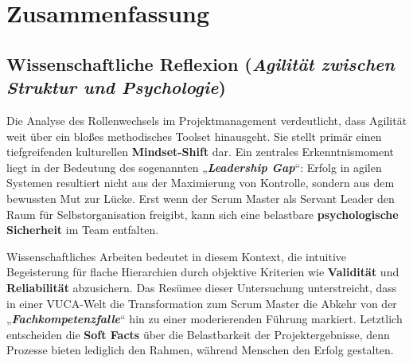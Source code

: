 
\chapter*{Zusammenfassung}
\label{chap:Zusammenfassung}
\thispagestyle{fancy}
\section*{Wissenschaftliche Reflexion (\textit{Agilität zwischen Struktur und Psychologie})} \par Die Analyse des Rollenwechsels im Projektmanagement verdeutlicht, dass Agilität weit über ein bloßes methodisches Toolset hinausgeht. Sie stellt primär einen tiefgreifenden kulturellen \textbf{Mindset-Shift} dar. Ein zentrales Erkenntnismoment liegt in der Bedeutung des sogenannten „\textbf{\textit{Leadership Gap}}“: Erfolg in agilen Systemen resultiert nicht aus der Maximierung von Kontrolle, sondern aus dem bewussten Mut zur Lücke. Erst wenn der Scrum Master als Servant Leader den Raum für Selbstorganisation freigibt, kann sich eine belastbare \textbf{psychologische Sicherheit} im Team entfalten. \par Wissenschaftliches Arbeiten bedeutet in diesem Kontext, die intuitive Begeisterung für flache Hierarchien durch objektive Kriterien wie \textbf{Validität} und \textbf{Reliabilität} abzusichern. Das Resümee dieser Untersuchung unterstreicht, dass in einer \acs{VUCA}-Welt die Transformation zum Scrum Master die Abkehr von der „\textbf{\textit{Fachkompetenzfalle}}“ hin zu einer moderierenden Führung markiert. Letztlich entscheiden die \textbf{Soft Facts} über die Belastbarkeit der Projektergebnisse, denn Prozesse bieten lediglich den Rahmen, während Menschen den Erfolg gestalten. 

